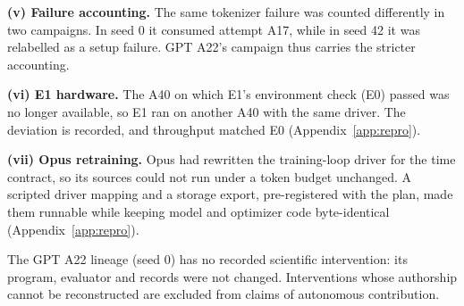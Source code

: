 \documentclass{article}
\begin{document}
{\textbf{(v) Failure accounting.} The same tokenizer failure was counted differently in two campaigns. In seed 0 it consumed attempt A17, while in seed 42 it was relabelled as a setup failure. GPT A22's campaign thus carries the stricter accounting.

\textbf{(vi) E1 hardware.} The A40 on which E1's environment check (E0) passed was no longer available, so E1 ran on another A40 with the same driver. The deviation is recorded, and throughput matched E0 (Appendix~\ref{app:repro}).

\textbf{(vii) Opus retraining.} Opus had rewritten the training-loop driver for the time contract, so its sources could not run under a token budget unchanged. A scripted driver mapping and a storage export, pre-registered with the plan, made them runnable while keeping model and optimizer code byte-identical (Appendix~\ref{app:repro}).

The GPT A22 lineage (seed 0) has no recorded scientific intervention: its program, evaluator and records were not changed. Interventions whose authorship cannot be reconstructed are excluded from claims of autonomous contribution.}
\end{document}
